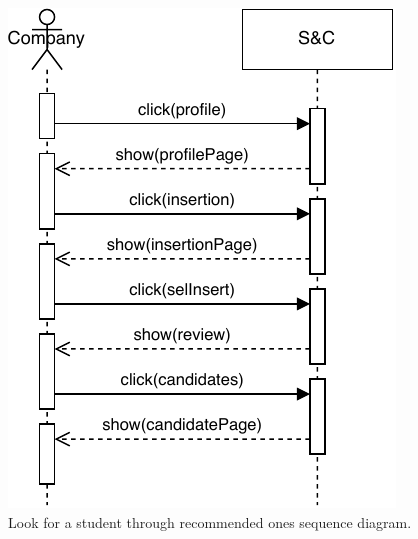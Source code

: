 \begin{figure}[H]
    \begin{center}
        \includegraphics[width=0.5\linewidth]{Images/SequenceDiagram/LookStudentSD.pdf}
        \caption{Look for a student through recommended ones sequence diagram.}
        \label{fig:look_student_seqdiag}%
    \end{center}
\end{figure}

\newpage

